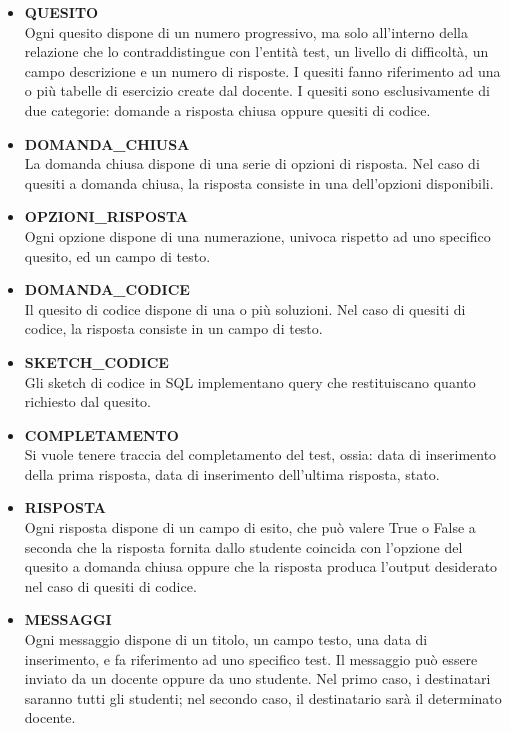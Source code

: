 \documentclass{article}
\begin{document}
\begin{itemize}[label={-}]
    \item \textbf{QUESITO} \vspace*{3px}\\ Ogni quesito dispone di un numero progressivo, ma solo all'interno della relazione che lo contraddistingue con l'entità test, un livello di difficoltà, un campo descrizione e un numero di risposte. I quesiti fanno riferimento ad una o più tabelle di esercizio create dal docente. I quesiti sono esclusivamente di due categorie: domande a risposta chiusa oppure quesiti di codice.
    \item \textbf{DOMANDA\_CHIUSA} \vspace*{3px}\\ La domanda chiusa dispone di una serie di opzioni di risposta. Nel caso di quesiti a domanda chiusa, la risposta consiste in una dell'opzioni disponibili. 
    \item \textbf{OPZIONI\_RISPOSTA} \vspace*{3px}\\ Ogni opzione dispone di una numerazione, univoca rispetto ad uno specifico quesito, ed un campo di testo. 
    \item \textbf{DOMANDA\_CODICE} \vspace*{3px}\\ Il quesito di codice dispone di una o più soluzioni. Nel caso di quesiti di codice, la risposta consiste in un campo di testo.
    \item \textbf{SKETCH\_CODICE} \vspace*{3px}\\ Gli sketch di codice in SQL implementano query che restituiscano quanto richiesto dal quesito.
    \item \textbf{COMPLETAMENTO} \vspace*{3px}\\ Si vuole tenere traccia del completamento del test, ossia: data di inserimento della prima risposta, data di inserimento dell'ultima risposta, stato.
    \item \textbf{RISPOSTA} \vspace*{3px}\\ Ogni risposta dispone di un campo di esito, che può valere True o False a seconda che la risposta fornita dallo studente coincida con l'opzione del quesito a domanda chiusa oppure che la risposta produca l'output desiderato nel caso di quesiti di codice.
    \item \textbf{MESSAGGI} \vspace*{3px}\\ Ogni messaggio dispone di un titolo, un campo testo, una data di inserimento, e fa riferimento ad uno specifico test. Il messaggio può essere inviato da un docente oppure da uno studente. Nel primo caso, i destinatari saranno tutti gli studenti; nel secondo caso, il destinatario sarà il determinato docente.
\end{itemize}
\end{document}
